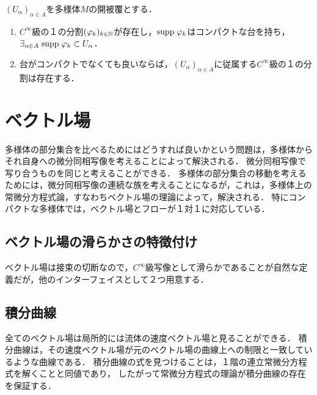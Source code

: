 \documentclass[uplatex,dvipdfmx]{jsreport}
\begin{document}
\begin{theorem}
    $(U_\alpha)_{\alpha\in A}$を多様体$M$の開被覆とする．
    \begin{enumerate}
        \item $C^\infty$級の１の分割$(\varphi_k)_{k\in\mathbb{N}}$が存在し，$\mathrm{supp}\;\varphi_k$はコンパクトな台を持ち，$\exists_{\alpha\in A}\;\mathrm{supp}\;\varphi_k\subset U_\alpha$．
        \item 台がコンパクトでなくても良いならば，$(U_\alpha)_{\alpha\in A}$に従属する$C^\infty$級の１の分割は存在する．
    \end{enumerate}
\end{theorem}

\section{ベクトル場}

\begin{tcolorbox}[colframe=ForestGreen, colback=ForestGreen!10!white,breakable,colbacktitle=ForestGreen!40!white,coltitle=black,fonttitle=\bfseries\sffamily,
title=]
    多様体の部分集合を比べるためにはどうすれば良いかという問題は，多様体からそれ自身への微分同相写像を考えることによって解決される．
    微分同相写像で写り合うものを同じと考えることができる．
    多様体の部分集合の移動を考えるためには，微分同相写像の連続な族を考えることになるが，これは，多様体上の常微分方程式論，すなわちベクトル場の理論によって，解決される．
    特にコンパクトな多様体では，ベクトル場とフローが１対１に対応している．
\end{tcolorbox}

\subsection{ベクトル場の滑らかさの特徴付け}

\begin{tcolorbox}[colframe=ForestGreen, colback=ForestGreen!10!white,breakable,colbacktitle=ForestGreen!40!white,coltitle=black,fonttitle=\bfseries\sffamily,
title=]
    ベクトル場は接束の切断なので，$C^\infty$級写像として滑らかであることが自然な定義だが，他のインターフェイスとして２つ用意する．
\end{tcolorbox}

\subsection{積分曲線}

\begin{tcolorbox}[colframe=ForestGreen, colback=ForestGreen!10!white,breakable,colbacktitle=ForestGreen!40!white,coltitle=black,fonttitle=\bfseries\sffamily,
title=]
    全てのベクトル場は局所的には流体の速度ベクトル場と見ることができる．
    積分曲線は，その速度ベクトル場が元のベクトル場の曲線上への制限と一致しているような曲線である．
    積分曲線の式を見つけることは，１階の連立常微分方程式を解くことと同値であり，
    したがって常微分方程式の理論が積分曲線の存在を保証する．
\end{tcolorbox}
\end{document}
